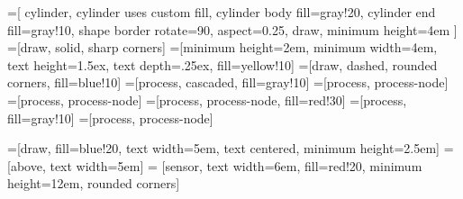     
=[
    cylinder,
    cylinder uses custom fill,
    cylinder body fill=gray!20,
    cylinder end fill=gray!10,
    shape border rotate=90,
    aspect=0.25,
    draw,
    minimum height=4em
]
=[draw, solid, sharp corners]
=[minimum height=2em, minimum width=4em,
    text height=1.5ex, text depth=.25ex, fill=yellow!10]
=[draw, dashed, rounded corners, fill=blue!10]
=[process, cascaded, fill=gray!10]
=[process, process-node]
=[process, process-node]
=[process, process-node, fill=red!30]
=[process, fill=gray!10]
=[process, process-node]

=[draw, fill=blue!20, text width=5em, 
    text centered, minimum height=2.5em]
 = [above, text width=5em]
 = [sensor, text width=6em, fill=red!20, 
    minimum height=12em, rounded corners]

\def\blockdist{2.3}
\def\edgedist{2.5}


